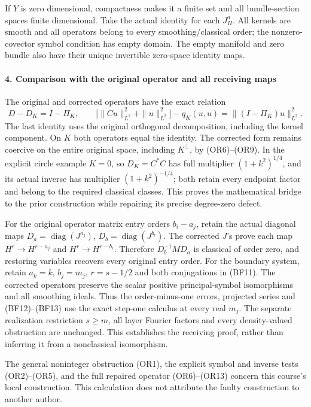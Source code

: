 \documentclass[
  11pt,
]{article}
\begin{document}
If \(Y\) is zero dimensional, compactness makes it a finite set and all
bundle-section spaces finite dimensional. Take the actual identity for
each \(J_H^a\). All kernels are smooth and all operators belong to every
smoothing/classical order; the nonzero-covector symbol condition has
empty domain. The empty manifold and zero bundle also have their unique
invertible zero-space identity maps.

\paragraph{4. Comparison with the original operator and all receiving
maps}\label{comparison-with-the-original-operator-and-all-receiving-maps}

The original and corrected operators have the exact relation \[
 D-D_K=I-\Pi_K,
 \qquad \big[\|Cu\|_{L^2}^2+\|u\|_{L^2}^2\big]-q_K(u,u)
 =\|(I-\Pi_K)u\|_{L^2}^2.
 \tag{OR13}
\] The last identity uses the original orthogonal decomposition,
including the kernel component. On \(K\) both operators equal the
identity. The corrected form remains coercive on the entire original
space, including \(K^\perp\), by (OR6)--(OR9). In the explicit circle
example \(K=0\), so \(D_K=C^*C\) has full multiplier \((1+k^2)^{1/4}\),
and its actual inverse has multiplier \((1+k^2)^{-1/4}\); both retain
every endpoint factor and belong to the required classical classes. This
proves the mathematical bridge to the prior construction while repairing
its precise degree-zero defect.

For the original operator matrix entry orders \(b_i-a_j\), retain the
actual diagonal maps \(D_a=\operatorname{diag}(J^{a_j})\),
\(D_b=\operatorname{diag}(J^{b_i})\). The corrected \(J\)'s prove each
map \(H^r\to H^{r-a_j}\) and \(H^r\to H^{r-b_i}\). Therefore
\(D_b^{-1}MD_a\) is classical of order zero, and restoring variables
recovers every original entry order. For the boundary system, retain
\(a_k=k\), \(b_j=m_j\), \(r=s-1/2\) and both conjugations in (BF11). The
corrected operators preserve the scalar positive principal-symbol
isomorphisms and all smoothing ideals. Thus the order-minus-one errors,
projected series and (BF12)--(BF13) use the exact step-one calculus at
every real \(m_j\). The separate realization restriction \(s\geq m\),
all layer Fourier factors and every density-valued obstruction are
unchanged. This establishes the receiving proof, rather than inferring
it from a nonclassical isomorphism.

The general noninteger obstruction (OR1), the explicit symbol and
inverse tests (OR2)--(OR5), and the full repaired operator (OR6)--(OR13)
concern this course's local construction. This calculation does not
attribute the faulty construction to another author.
\end{document}
